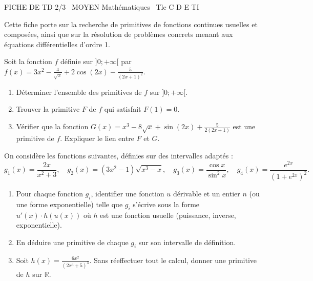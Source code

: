 \documentclass[11pt]{article}
\begin{document}
\begin{tcolorbox}[enhanced,colback=popink,colframe=popink,arc=10pt,boxrule=0pt,left=12pt,right=12pt,top=9pt,bottom=9pt]
{\color{white}\popxbold\small FICHE DE TD 2/3 \textbullet\ MOYEN \hfill Mathématiques \textbullet\ Tle C D E TI\par}
\end{tcolorbox}
\vspace{4pt}
\noindent Cette fiche porte sur la recherche de primitives de fonctions continues usuelles et composées, ainsi que sur la résolution de problèmes concrets menant aux équations différentielles d'ordre 1.

\begin{exercice}
Soit la fonction $f$ définie sur $]0; +\infty[$ par $f(x) = 3x^2 - \frac{4}{\sqrt{x}} + 2\cos(2x) - \frac{5}{(2x+1)^2}$.
\begin{enumerate}
    \item Déterminer l'ensemble des primitives de $f$ sur $]0; +\infty[$.
    \item Trouver la primitive $F$ de $f$ qui satisfait $F(1) = 0$.
    \item Vérifier que la fonction $G(x) = x^3 - 8\sqrt{x} + \sin(2x) + \frac{5}{2(2x+1)}$ est une primitive de $f$. Expliquer le lien entre $F$ et $G$.
\end{enumerate}
\end{exercice}

\begin{exercice}
On considère les fonctions suivantes, définies sur des intervalles adaptés :
\[
g_1(x) = \frac{2x}{x^2+3},\quad g_2(x) = (3x^2-1)\sqrt{x^3-x},\quad g_3(x) = \frac{\cos x}{\sin^2 x},\quad g_4(x) = \frac{e^{2x}}{(1+e^{2x})^2}.
\]
\begin{enumerate}
    \item Pour chaque fonction $g_i$, identifier une fonction $u$ dérivable et un entier $n$ (ou une forme exponentielle) telle que $g_i$ s'écrive sous la forme $u'(x) \cdot h(u(x))$ où $h$ est une fonction usuelle (puissance, inverse, exponentielle).
    \item En déduire une primitive de chaque $g_i$ sur son intervalle de définition.
    \item Soit $h(x) = \frac{6x^2}{(2x^3+5)^3}$. Sans réeffectuer tout le calcul, donner une primitive de $h$ sur $\mathbb{R}$.
\end{enumerate}
\end{exercice}
\end{document}
